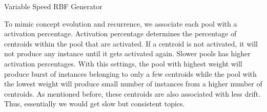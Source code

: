 \documentclass[a4paper, 11pt, oneside]{book}
\begin{document}
\begin{algorithm}[htbp]
    \caption{Variable Speed RBF Generator}
    \label{alg:vsrbf}
    \DontPrintSemicolon
      
    
    
\end{algorithm}

To mimic concept evolution and recurrence, we associate each pool with a activation percentage. Activation percentage determines the percentage of centroids within the pool that are activated. If a centroid is not activated, it will not produce any instance until it gets activated again. Slower pools has higher activation percentages. With this settings, the pool with highest weight will produce burst of instances belonging to only a few centroids while the pool with the lowest weight will produce small number of instances from a higher number of centroids. As mentioned before, these centroids are also associated with less drift. Thus, essentially we would get slow but consistent topics.
\end{document}
